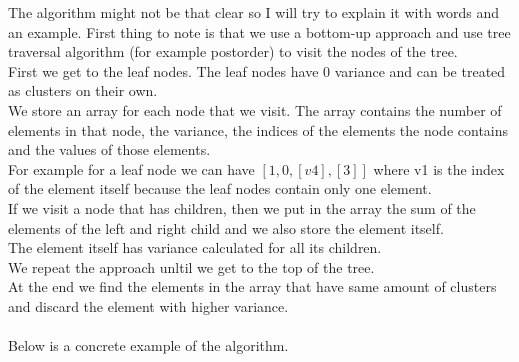 \documentclass[11pt]{article}
\begin{document}
The algorithm might not be that clear so I will try to explain it with words and an example.
\newpage
First thing to note is that we use a bottom-up approach and use tree traversal algorithm (for example postorder) to visit the nodes of the tree. \\
First we get to the leaf nodes. The leaf nodes have 0 variance and can be treated as clusters on their own. \\
We store an array for each node that we visit. The array contains the number of elements in that node, the variance, the indices of the elements the node contains and the values of those elements. \\
For example for a leaf node we can have $ [1, 0, [v4], [3]] $ where v1 is the index of the element itself because the leaf nodes contain only one element. \\
If we visit a node that has children, then we put in the array the sum of the elements of the left and right child and we also store the element itself. \\ 
The element itself has variance calculated for all its children. \\
We repeat the approach unltil we get to the top of the tree. \\
At the end we find the elements in the array that have same amount of clusters and discard the element with higher variance. \\~\\
Below is a concrete example of the algorithm.
\end{document}
